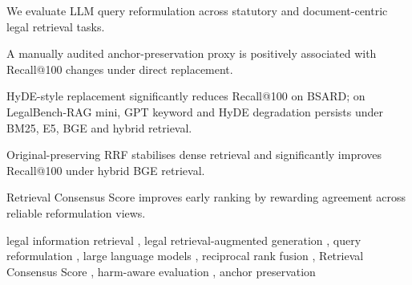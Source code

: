 \documentclass[a4paper,fleqn]{cas-dc}
\begin{document}
\begin{highlights}
\item We evaluate LLM query reformulation across statutory and document-centric legal retrieval tasks.
\item A manually audited anchor-preservation proxy is positively associated with Recall@100 changes under direct replacement.
\item HyDE-style replacement significantly reduces Recall@100 on BSARD; on LegalBench-RAG mini, GPT keyword and HyDE degradation persists under BM25, E5, BGE and hybrid retrieval.
\item Original-preserving RRF stabilises dense retrieval and significantly improves Recall@100 under hybrid BGE retrieval.
\item Retrieval Consensus Score improves early ranking by rewarding agreement across reliable reformulation views.
\end{highlights}
\begin{keywords}
legal information retrieval \sep
legal retrieval-augmented generation \sep
query reformulation \sep
large language models \sep
reciprocal rank fusion \sep
Retrieval Consensus Score \sep
harm-aware evaluation \sep
anchor preservation
\end{keywords}
\maketitle
\end{document}
